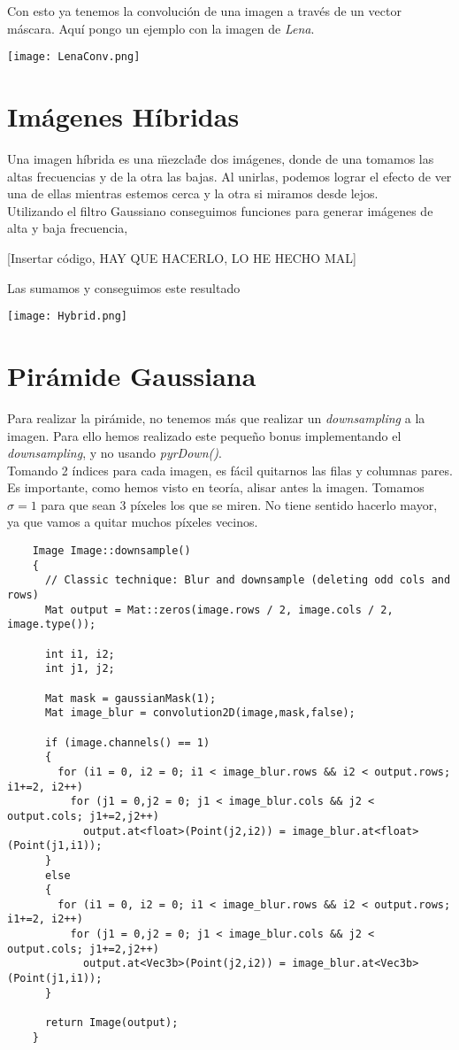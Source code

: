 \documentclass[a4paper, 11pt]{article}
\theoremstyle{definition}
\begin{document}
  Con esto ya tenemos la convolución de una imagen a través de un vector máscara.
  Aquí pongo un ejemplo con la imagen de \textit{Lena}.

  \centerline{\texttt{[image: LenaConv.png]}}


  \section{Imágenes Híbridas}

  Una imagen híbrida es una \"mezcla\" de dos imágenes, donde de una tomamos las altas
  frecuencias y de la otra las bajas. Al unirlas, podemos lograr el efecto de
  ver una de ellas mientras estemos cerca y la otra si miramos desde lejos.\\

  Utilizando el filtro Gaussiano conseguimos funciones para generar imágenes de alta
  y baja frecuencia,

  [Insertar código, HAY QUE HACERLO, LO HE HECHO MAL]

  Las sumamos y conseguimos este resultado

  \centerline{\texttt{[image: Hybrid.png]}}

  \section{Pirámide Gaussiana}

  Para realizar la pirámide, no tenemos más que realizar un \textit{downsampling}
  a la imagen. Para ello hemos realizado este pequeño bonus implementando el
  \textit{downsampling}, y no usando \textit{pyrDown()}.\\

  Tomando 2 índices para cada imagen, es fácil quitarnos las filas y columnas pares.
  Es importante, como hemos visto en teoría, alisar antes la imagen. Tomamos $\sigma=1$
  para que sean 3 píxeles los que se miren. No tiene sentido hacerlo mayor, ya que
  vamos a quitar muchos píxeles vecinos.

  \begin{lstlisting}
    Image Image::downsample()
    {
      // Classic technique: Blur and downsample (deleting odd cols and rows)
      Mat output = Mat::zeros(image.rows / 2, image.cols / 2, image.type());

      int i1, i2;
      int j1, j2;

      Mat mask = gaussianMask(1);
      Mat image_blur = convolution2D(image,mask,false);

      if (image.channels() == 1)
      {
        for (i1 = 0, i2 = 0; i1 < image_blur.rows && i2 < output.rows; i1+=2, i2++)
          for (j1 = 0,j2 = 0; j1 < image_blur.cols && j2 < output.cols; j1+=2,j2++)
            output.at<float>(Point(j2,i2)) = image_blur.at<float>(Point(j1,i1));
      }
      else
      {
        for (i1 = 0, i2 = 0; i1 < image_blur.rows && i2 < output.rows; i1+=2, i2++)
          for (j1 = 0,j2 = 0; j1 < image_blur.cols && j2 < output.cols; j1+=2,j2++)
            output.at<Vec3b>(Point(j2,i2)) = image_blur.at<Vec3b>(Point(j1,i1));
      }

      return Image(output);
    }
  \end{lstlisting}
\end{document}
